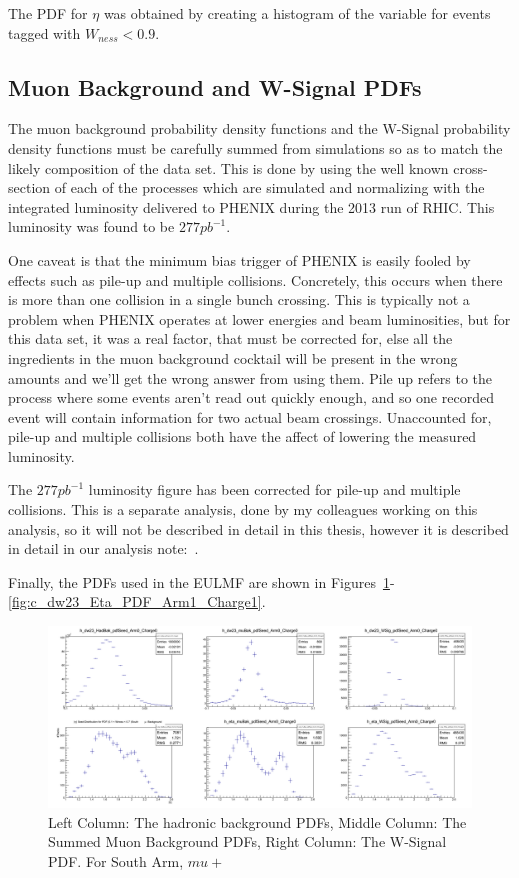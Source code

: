 The PDF for $\eta$ was obtained by creating a histogram of the variable for
events tagged with $W_{ness} < 0.9$. 

\clearpage
\subsection{Muon Background and W-Signal PDFs}

The muon background probability density functions and the W-Signal probability
density functions must be carefully summed from simulations so as to match the
likely composition of the data set. This is done by using the well known
cross-section of each of the processes which are simulated and normalizing with
the integrated luminosity delivered to PHENIX during the 2013 run of RHIC. This
luminosity was found to be $277 pb^{-1}$.

One caveat is that the minimum bias trigger of PHENIX is easily fooled by
effects such as pile-up and multiple collisions. Concretely, this occurs when
there is more than one collision in a single bunch crossing. This is typically
not a problem when PHENIX operates at lower energies and beam luminosities, but
for this data set, it was a real factor, that must be corrected for, else all
the ingredients in the muon background cocktail will be present in the wrong
amounts and we'll get the wrong answer from using them. Pile up refers to the
process where some events aren't read out quickly enough, and so one recorded
event will contain information for two actual beam crossings. Unaccounted for,
pile-up and multiple collisions both have the affect of lowering the measured
luminosity.

The $277 pb^{-1}$ luminosity figure has been corrected for pile-up and multiple
collisions. This is a separate analysis, done by my colleagues working on this
analysis, so it will not be described in detail in this thesis, however it is
described in detail in our analysis note:~\cite{Seidl2014a}.

Finally, the PDFs used in the EULMF are shown in
Figures~\ref{fig:c_dw23_Eta_PDF_Arm0_Charge0}-\ref{fig:c_dw23_Eta_PDF_Arm1_Charge1}.

\begin{figure}
  \centering
  \includegraphics[width=\linewidth]{././figures/c_dw23_Eta_PDF_Arm0_Charge0.png}
  \caption{
    Left Column: The hadronic background PDFs, Middle Column: The Summed Muon
    Background PDFs, Right Column: The W-Signal PDF. For South Arm, $mu+$
  }
  \label{fig:c_dw23_Eta_PDF_Arm0_Charge0}
\end{figure}

